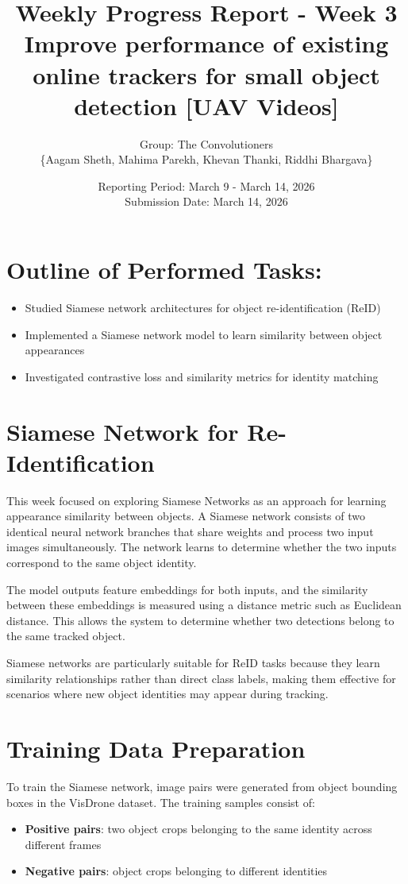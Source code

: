\documentclass[11pt,a4paper]{article}
\title{\textbf{Weekly Progress Report - Week 3} \\
	\large Improve performance of existing online trackers for small object detection [UAV Videos]}
\author{Group: The Convolutioners\\\{Aagam Sheth, Mahima Parekh, Khevan Thanki, Riddhi Bhargava\}}
\date{Reporting Period: March 9 - March 14, 2026 \\
	Submission Date: March 14, 2026}
\begin{document}
	
	\maketitle
	
	\section*{Outline of Performed Tasks:}
	\begin{itemize}[leftmargin=*]
		\item Studied Siamese network architectures for object re-identification (ReID)
		\item Implemented a Siamese network model to learn similarity between object appearances
		\item Investigated contrastive loss and similarity metrics for identity matching
	\end{itemize}
	
	\section*{Siamese Network for Re-Identification}
	
	This week focused on exploring Siamese Networks as an approach for learning appearance similarity between objects. 
	A Siamese network consists of two identical neural network branches that share weights and process two input images simultaneously. 
	The network learns to determine whether the two inputs correspond to the same object identity.
	
	The model outputs feature embeddings for both inputs, and the similarity between these embeddings is measured using a distance metric such as Euclidean distance.
	This allows the system to determine whether two detections belong to the same tracked object.
	
	Siamese networks are particularly suitable for ReID tasks because they learn similarity relationships rather than direct class labels, making them effective for scenarios where new object identities may appear during tracking.
	
	\section*{Training Data Preparation}
	
	To train the Siamese network, image pairs were generated from object bounding boxes in the VisDrone dataset. The training samples consist of:
	\begin{itemize}
		\item \textbf{Positive pairs}: two object crops belonging to the same identity across different frames
		\item \textbf{Negative pairs}: object crops belonging to different identities
	\end{itemize}
	
\end{document}
